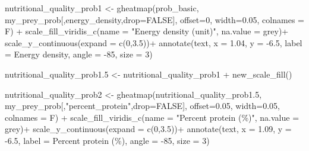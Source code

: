 \documentclass[
]{article}
\newenvironment{Shaded}{\begin{snugshade}}{\end{snugshade}}
\newcommand{\AttributeTok}[1]{\textcolor[rgb]{0.77,0.63,0.00}{#1}}
\newcommand{\ConstantTok}[1]{\textcolor[rgb]{0.00,0.00,0.00}{#1}}
\newcommand{\DecValTok}[1]{\textcolor[rgb]{0.00,0.00,0.81}{#1}}
\newcommand{\FloatTok}[1]{\textcolor[rgb]{0.00,0.00,0.81}{#1}}
\newcommand{\FunctionTok}[1]{\textcolor[rgb]{0.00,0.00,0.00}{#1}}
\newcommand{\NormalTok}[1]{#1}
\newcommand{\OtherTok}[1]{\textcolor[rgb]{0.56,0.35,0.01}{#1}}
\newcommand{\SpecialCharTok}[1]{\textcolor[rgb]{0.00,0.00,0.00}{#1}}
\newcommand{\StringTok}[1]{\textcolor[rgb]{0.31,0.60,0.02}{#1}}
\begin{document}
\begin{Shaded}
\begin{Highlighting}[]
\NormalTok{nutritional\_quality\_prob1 }\OtherTok{\textless{}{-}} \FunctionTok{gheatmap}\NormalTok{(prob\_basic, my\_prey\_prob[,}\StringTok{\textquotesingle{}energy\_density\textquotesingle{}}\NormalTok{,}\AttributeTok{drop=}\ConstantTok{FALSE}\NormalTok{], }
                                      \AttributeTok{offset=}\DecValTok{0}\NormalTok{, }\AttributeTok{width=}\FloatTok{0.05}\NormalTok{, }\AttributeTok{colnames =}\NormalTok{ F) }\SpecialCharTok{+}
  \FunctionTok{scale\_fill\_viridis\_c}\NormalTok{(}\AttributeTok{name =} \StringTok{"Energy density (unit)"}\NormalTok{, }
                       \AttributeTok{na.value =} \StringTok{\textquotesingle{}grey\textquotesingle{}}\NormalTok{)}\SpecialCharTok{+}
  \FunctionTok{scale\_y\_continuous}\NormalTok{(}\AttributeTok{expand =} \FunctionTok{c}\NormalTok{(}\DecValTok{0}\NormalTok{,}\FloatTok{3.5}\NormalTok{))}\SpecialCharTok{+}
  \FunctionTok{annotate}\NormalTok{(}\StringTok{\textquotesingle{}text\textquotesingle{}}\NormalTok{, }\AttributeTok{x =} \FloatTok{1.04}\NormalTok{, }\AttributeTok{y =} \SpecialCharTok{{-}}\FloatTok{6.5}\NormalTok{, }\AttributeTok{label =} \StringTok{\textquotesingle{}Energy density\textquotesingle{}}\NormalTok{, }\AttributeTok{angle =} \SpecialCharTok{{-}}\DecValTok{85}\NormalTok{, }\AttributeTok{size =} \DecValTok{3}\NormalTok{)}

\NormalTok{nutritional\_quality\_prob1}\FloatTok{.5} \OtherTok{\textless{}{-}}\NormalTok{ nutritional\_quality\_prob1 }\SpecialCharTok{+} \FunctionTok{new\_scale\_fill}\NormalTok{()}

\NormalTok{nutritional\_quality\_prob2 }\OtherTok{\textless{}{-}} \FunctionTok{gheatmap}\NormalTok{(nutritional\_quality\_prob1}\FloatTok{.5}\NormalTok{, my\_prey\_prob[,}\StringTok{"percent\_protein"}\NormalTok{,}\AttributeTok{drop=}\ConstantTok{FALSE}\NormalTok{], }
                                      \AttributeTok{offset=}\FloatTok{0.05}\NormalTok{, }\AttributeTok{width=}\FloatTok{0.05}\NormalTok{, }\AttributeTok{colnames =}\NormalTok{ F) }\SpecialCharTok{+}
  \FunctionTok{scale\_fill\_viridis\_c}\NormalTok{(}\AttributeTok{name =} \StringTok{"Percent protein (\%)"}\NormalTok{, }
                       \AttributeTok{na.value =} \StringTok{\textquotesingle{}grey\textquotesingle{}}\NormalTok{)}\SpecialCharTok{+}
  \FunctionTok{scale\_y\_continuous}\NormalTok{(}\AttributeTok{expand =} \FunctionTok{c}\NormalTok{(}\DecValTok{0}\NormalTok{,}\FloatTok{3.5}\NormalTok{))}\SpecialCharTok{+}
  \FunctionTok{annotate}\NormalTok{(}\StringTok{\textquotesingle{}text\textquotesingle{}}\NormalTok{, }\AttributeTok{x =} \FloatTok{1.09}\NormalTok{, }\AttributeTok{y =} \SpecialCharTok{{-}}\FloatTok{6.5}\NormalTok{, }\AttributeTok{label =} \StringTok{\textquotesingle{}Percent protein (\%)\textquotesingle{}}\NormalTok{, }\AttributeTok{angle =} \SpecialCharTok{{-}}\DecValTok{85}\NormalTok{, }\AttributeTok{size =} \DecValTok{3}\NormalTok{)}


\end{Highlighting}
\end{Shaded}
\end{document}
